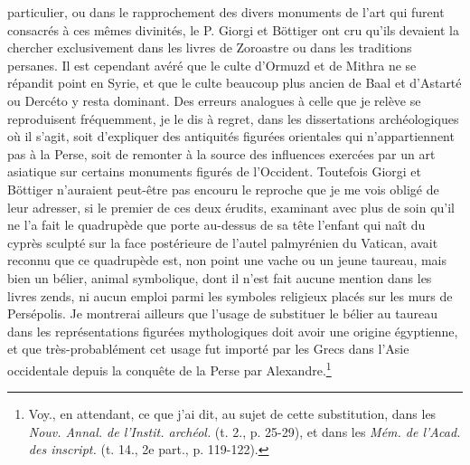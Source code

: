\documentclass[a4paper, 11pt, oneside, polutonikogreek, french]{article}
\begin{document}
particulier, ou dans le rapprochement des divers monuments de l'art qui furent consacrés à ces mêmes divinités, le P. Giorgi et Böttiger ont cru qu'ils devaient la chercher exclusivement dans les livres de Zoroastre ou dans les traditions persanes. Il est cependant avéré que le culte d'Ormuzd et de Mithra ne se répandit point en Syrie, et que le culte beaucoup plus ancien de Baal et d'Astarté ou Dercéto y resta dominant. Des erreurs analogues à celle que je relève se reproduisent fréquemment, je le dis à regret, dans les dissertations archéologiques où il s'agit, soit d'expliquer des antiquités figurées orientales qui n'appartiennent pas à la Perse, soit de remonter à la source des influences exercées par un art asiatique sur certains monuments figurés de l'Occident. Toutefois Giorgi et Böttiger n'auraient peut-être pas encouru le reproche que je me vois obligé de leur adresser, si le premier de ces deux érudits, examinant avec plus de soin qu'il ne l'a fait le quadrupède que porte au-dessus de sa tête l'enfant qui naît du cyprès sculpté sur la face postérieure de l'autel palmyrénien du Vatican, avait reconnu que ce quadrupède est, non point une vache ou un jeune taureau, mais bien un bélier, animal symbolique, dont il n'est fait aucune mention dans les livres zends, ni aucun emploi parmi les symboles religieux placés sur les murs de Persépolis. Je montrerai ailleurs que l'usage de substituer le bélier au taureau dans les représentations figurées mythologiques doit avoir une origine égyptienne, et que très-probablément cet usage fut importé par les Grecs dans l'Asie occidentale depuis la conquête de la Perse par Alexandre.\footnote{Voy., en attendant, ce que j'ai dit, au sujet de cette substitution, dans les \emph{Nouv. Annal. de l'Instit. archéol.} (t. 2., p. 25-29), et dans les \emph{Mém. de l'Acad. des inscript.} (t. 14., 2e part., p. 119-122).}
\end{document}

